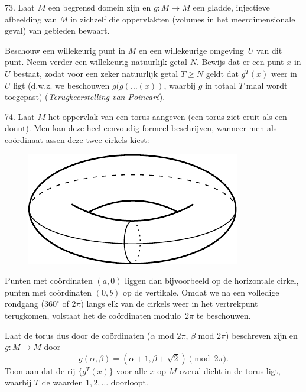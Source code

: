 \clearpage

\begin{problem}{73.}
	Laat $M$ een begrensd domein zijn en $g \colon M \to M$ een gladde, injectieve afbeelding van $M$ in zichzelf die oppervlakten (volumes in het meerdimensionale geval) van gebieden bewaart.

	Beschouw een willekeurig punt in $M$ en een willekeurige omge\-ving~$U$ van dit punt. Neem verder een willekeurig natuurlijk getal $N$. Bewijs dat er een punt $x$ in $U$ bestaat, zodat voor een zeker natuurlijk getal $T \geq N$ geldt dat $g^T(x)$ weer in $U$ ligt (d.w.z. we beschouwen $g(g(\dots(x))$, waarbij $g$ in totaal $T$ maal wordt toegepast) (\textit{Terugkeer\-stelling van Poincaré}).
\end{problem}

\begin{problem}{74.}
	Laat $M$ het oppervlak van een torus aangeven (een torus ziet eruit als een donut). Men kan deze heel eenvoudig formeel beschrijven, wanneer men als coördinaat-assen deze twee cirkels kiest:
	\begin{figure}
		\includegraphics{resources/74_torus}
	\end{figure}
\noindent Punten met coördinaten $(a,0)$ liggen dan bijvoorbeeld op de horizon\-tale cirkel, punten met coördinaten $(0,b)$ op de vertikale. Omdat we na een volledige rondgang (${360}^\circ$ of $2 \pi$) langs elk van de cirkels weer in het vertrekpunt terugkomen, volstaat het de coördinaten modulo~$2 \pi$ te beschouwen.

	Laat de torus dus door de coördinaten ($\alpha$ mod $2 \pi$, $\beta$ mod $2 \pi$) beschreven zijn en $g \colon M \to M$ door
	\begin{equation*}
		g(\alpha,\beta) = (\alpha + 1,\beta + \sqrt{2}) \pmod {2 \pi}.
	\end{equation*}
	Toon aan dat de rij $\{g^T(x)\}$ voor alle $x$ op $M$ overal dicht in de torus ligt, waarbij $T$ de waarden $1,2,\dotsc$ doorloopt.
\end{problem}

